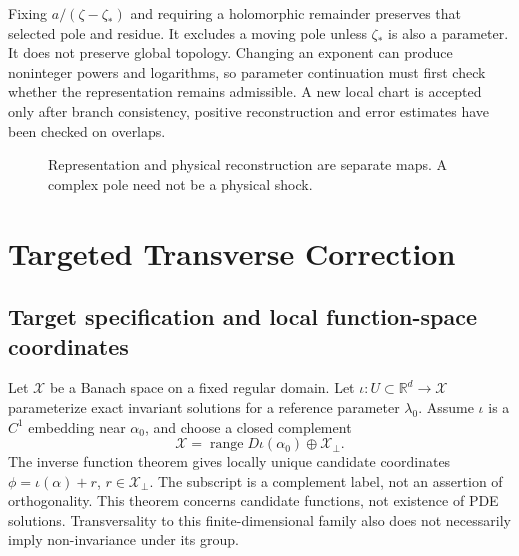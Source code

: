 \documentclass[12pt,a4paper,oneside]{report}
\numberwithin{equation}{chapter}
\theoremstyle{remark}\newtheorem{remark}[theorem]{Remark}
\begin{document}
Fixing $a/(\zeta-\zeta_*)$ and requiring a holomorphic remainder preserves that selected pole and residue. It excludes a moving pole unless $\zeta_*$ is also a parameter. It does not preserve global topology. Changing an exponent can produce noninteger powers and logarithms, so parameter continuation must first check whether the representation remains admissible. A new local chart is accepted only after branch consistency, positive reconstruction and error estimates have been checked on overlaps.

\begin{figure}[htbp]\centering
{}
\caption[Representation and physical reconstruction]{Representation and physical reconstruction are separate maps. A complex pole need not be a physical shock.}
\end{figure}
\chapter{Targeted Transverse Correction}\label{ch:correction}
\section{Target specification and local function-space coordinates}
Let $\mathcal X$ be a Banach space on a fixed regular domain. Let $\iota:U\subset\mathbb R^d\to\mathcal X$ parameterize exact invariant solutions for a reference parameter $\lambda_0$. Assume $\iota$ is a $C^1$ embedding near $\alpha_0$, and choose a closed complement
\[
 \mathcal X=\operatorname{range}D\iota(\alpha_0)\oplus\mathcal X_\perp.
\]
The inverse function theorem gives locally unique candidate coordinates $\phi=\iota(\alpha)+r$, $r\in\mathcal X_\perp$. The subscript is a complement label, not an assertion of orthogonality. This theorem concerns candidate functions, not existence of PDE solutions. Transversality to this finite-dimensional family also does not necessarily imply non-invariance under its group.
\end{document}
